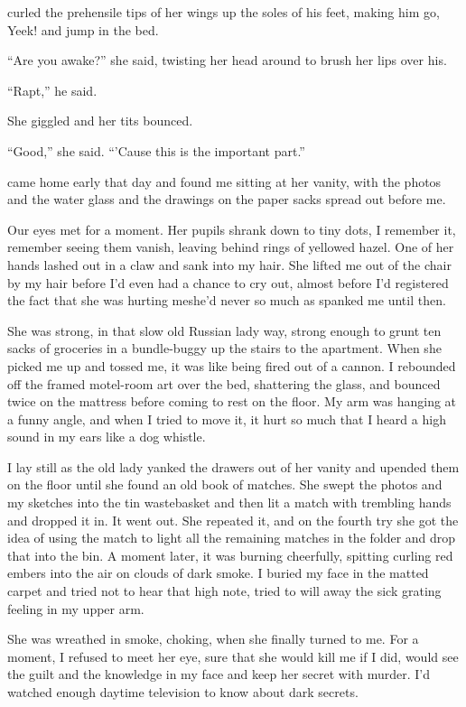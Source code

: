  curled the prehensile tips of her wings up the soles of his feet,
making him go, Yeek!  and jump in the bed.

``Are you awake?'' she said, twisting her head around to brush her
lips over his.

``Rapt,'' he said.

She giggled and her tits bounced.

``Good,'' she said.  ``'Cause this is the important part.''

 came home early that day and found me sitting at her vanity,
with the photos and the water glass and the drawings on the paper
sacks spread out before me.

Our eyes met for a moment.  Her pupils shrank down to tiny dots, I
remember it, remember seeing them vanish, leaving behind rings of
yellowed hazel.  One of her hands lashed out in a claw and sank into
my hair.  She lifted me out of the chair by my hair before I'd even
had a chance to cry out, almost before I'd registered the fact that
she was hurting me\dash{}she'd never so much as spanked me until then.

She was strong, in that slow old Russian lady way, strong enough to
grunt ten sacks of groceries in a bundle-buggy up the stairs to the
apartment.  When she picked me up and tossed me, it was like being
fired out of a cannon.  I rebounded off the framed motel-room art over
the bed, shattering the glass, and bounced twice on the mattress
before coming to rest on the floor.  My arm was hanging at a funny
angle, and when I tried to move it, it hurt so much that I heard a
high sound in my ears like a dog whistle.

I lay still as the old lady yanked the drawers out of her vanity and
upended them on the floor until she found an old book of matches.  She
swept the photos and my sketches into the tin wastebasket and then lit
a match with trembling hands and dropped it in.  It went out.  She
repeated it, and on the fourth try she got the idea of using the match
to light all the remaining matches in the folder and drop that into
the bin.  A moment later, it was burning cheerfully, spitting curling
red embers into the air on clouds of dark smoke.  I buried my face in
the matted carpet and tried not to hear that high note, tried to will
away the sick grating feeling in my upper arm.

She was wreathed in smoke, choking, when she finally turned to me. 
For a moment, I refused to meet her eye, sure that she would kill me
if I did, would see the guilt and the knowledge in my face and keep
her secret with murder.  I'd watched enough daytime television to know
about dark secrets.

